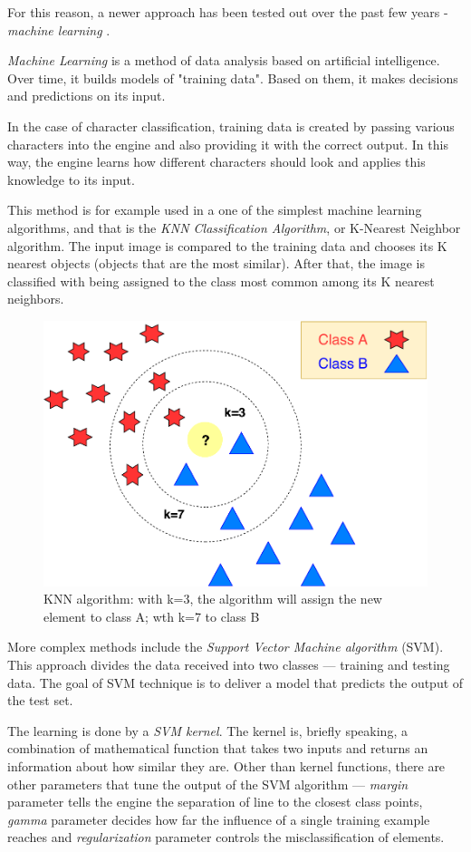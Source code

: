 For this reason, a newer approach has been tested out over the past few years - \emph{machine learning} \citep{characterClassification}.

\emph{Machine Learning} \citep{sebastiani2002machine} is a method of data analysis based on artificial intelligence. Over time, it builds models of "training data". Based on them, it makes decisions and predictions on its input. 

In the case of character classification, training data is created by passing various characters into the engine and also providing it with the correct output. In this way, the engine learns how different characters should look and applies this knowledge to its input.

This method is for example used in a one of the simplest machine learning algorithms, and that is the \emph{KNN Classification Algorithm}, or K-Nearest Neighbor algorithm. The input image is compared to the training data and chooses its K nearest objects (objects that are the most similar). After that, the image is classified with being assigned to the class most common among its K nearest neighbors.

\begin{figure}[H]
\centering
\includegraphics[width=0.7\linewidth]{img/knn.pdf}
\caption{KNN algorithm: with k=3, the algorithm will assign the new element to class A; wth k=7 to class B } \label{fig:1a}
\end{figure}

More complex methods include the \emph{Support Vector Machine algorithm} (SVM). This approach divides the data received into two classes --- training and testing data. The goal of SVM technique is to deliver a model that predicts the output of the test set.

The learning is done by a \emph{SVM kernel}. The kernel is, briefly speaking, a combination of mathematical function that takes two inputs and returns an information about how similar they are. Other than kernel functions, there are other parameters that tune the output of the SVM algorithm --- \emph{margin} parameter tells the engine the separation of line to the closest class points, \emph{gamma} parameter decides how far the influence of a single training example reaches and \emph{regularization} parameter controls the misclassification of elements.


